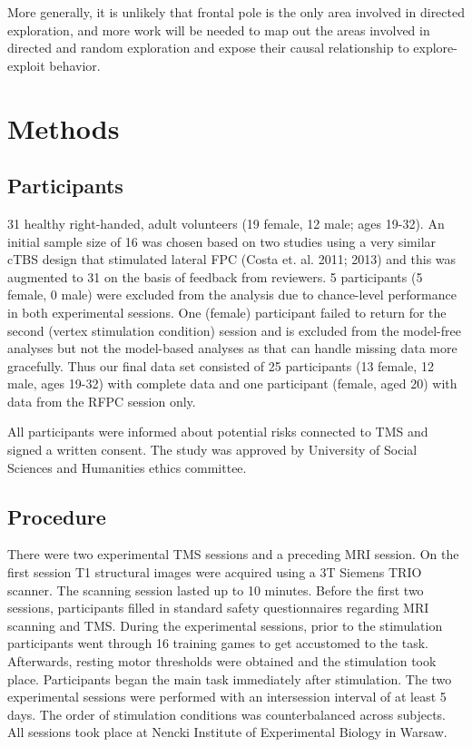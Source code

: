 \documentclass[12pt]{article}
\begin{document}
More generally, it is unlikely that frontal pole is the only area involved in directed exploration, and more work will be needed to map out the areas involved in directed and random exploration and expose their causal relationship to explore-exploit behavior.

\section*{Methods}
\subsection*{Participants}
31 healthy right-handed, adult volunteers (19 female, 12 male; ages 19-32). An initial sample size of 16 was chosen based on two studies using a very similar cTBS design that stimulated lateral FPC (Costa et. al. 2011; 2013) and this was augmented to 31 on the basis of feedback from reviewers. 5 participants (5 female, 0 male) were excluded from the analysis due to chance-level performance in both experimental sessions. One (female) participant failed to return for the second (vertex stimulation condition) session and is excluded from the model-free analyses but not the model-based analyses as that can handle missing data more gracefully. Thus our final data set consisted of 25 participants (13 female, 12 male, ages 19-32) with complete data and one participant (female, aged 20) with data from the RFPC session only.

All participants were informed about potential risks connected to TMS and signed a written consent. The study was approved by University of Social Sciences and Humanities ethics committee.

\subsection*{Procedure}
There were two experimental TMS sessions and a preceding MRI session.  On the first session T1 structural images were acquired using a 3T Siemens TRIO scanner. The scanning session lasted up to 10 minutes. Before the first two sessions, participants filled in standard safety questionnaires regarding MRI scanning and TMS. During the experimental sessions, prior to the stimulation participants went through 16 training games to get accustomed to the task. Afterwards, resting motor thresholds were obtained and the stimulation took place. Participants began the main task immediately after stimulation. The two experimental sessions were performed with an intersession interval of at least 5 days. The order of stimulation conditions was counterbalanced across subjects. All sessions took place at Nencki Institute of Experimental Biology in Warsaw.
\end{document}
